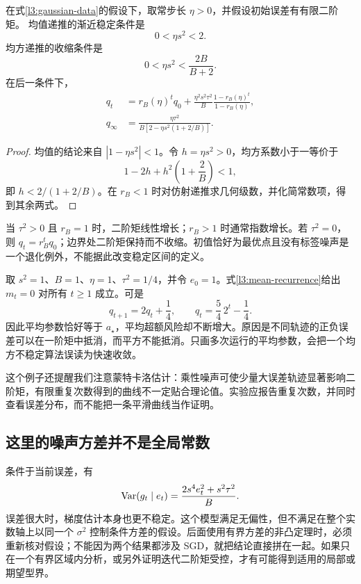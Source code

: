 \begin{theorem}[高斯随机回归的稳定条件]
在式\eqref{l3:gaussian-data}的假设下，取常步长 $\eta>0$，并假设初始误差有有限二阶矩。
均值递推的渐近稳定条件是
\begin{equation}
 0<\eta s^2<2.
 \label{l3:mean-stability}
\end{equation}
均方递推的收缩条件是
\begin{equation}
 \boxed{0<\eta s^2<\frac{2B}{B+2}}.
 \label{l3:mean-square-stability}
\end{equation}
在后一条件下，
\begin{align}
 q_t&=r_B(\eta)^t q_0+
 \frac{\eta^2s^2\tau^2}{B}\frac{1-r_B(\eta)^t}{1-r_B(\eta)},\label{l3:finite-time-q}\\
 q_\infty&=\frac{\eta\tau^2}{B\left[2-\eta s^2(1+2/B)\right]}.
 \label{l3:gaussian-floor}
\end{align}
\end{theorem}
\begin{proof}
均值的结论来自 $|1-\eta s^2|<1$。令 $h=\eta s^2>0$，均方系数小于一等价于
\[
 1-2h+h^2\left(1+\frac2B\right)<1,
\]
即 $h<2/(1+2/B)$。在 $r_B<1$ 时对仿射递推求几何级数，并化简常数项，得到其余两式。
\end{proof}

当 $\tau^2>0$ 且 $r_B=1$ 时，二阶矩线性增长；$r_B>1$ 时通常指数增长。若 $\tau^2=0$，则 $q_t=r_B^tq_0$；边界处二阶矩保持而不收缩。初值恰好为最优点且没有标签噪声是一个退化例外，不能据此改变稳定区间的定义。

\begin{example}
取 $s^2=1$、$B=1$、$\eta=1$、$\tau^2=1/4$，并令 $e_0=1$。式\eqref{l3:mean-recurrence}给出 $m_t=0$ 对所有 $t\geq1$ 成立。可是
\[
 q_{t+1}=2q_t+\frac14,
 \qquad q_t=\frac54\,2^t-\frac14.
\]
因此平均参数恰好等于 $a_\star$，平均超额风险却不断增大。原因是不同轨迹的正负误差可以在一阶矩中抵消，而平方不能抵消。只画多次运行的平均参数，会把一个均方不稳定算法误读为快速收敛。

这个例子还提醒我们注意蒙特卡洛估计：乘性噪声可使少量大误差轨迹显著影响二阶矩，有限重复次数得到的曲线不一定贴合理论值。实验应报告重复次数，并同时查看误差分布，而不能把一条平滑曲线当作证明。
\end{example}

\subsection{这里的噪声方差并不是全局常数}

条件于当前误差，有
\begin{equation}
 \operatorname{Var}(g_t\mid e_t)=\frac{2s^4e_t^2+s^2\tau^2}{B}.
 \label{l3:state-dependent-noise}
\end{equation}
误差很大时，梯度估计本身也更不稳定。这个模型满足无偏性，但不满足在整个实数轴上以同一个 $\sigma^2$ 控制条件方差的假设。后面使用有界方差的非凸定理时，必须重新核对假设；不能因为两个结果都涉及 SGD，就把结论直接拼在一起。如果只在一个有界区域内分析，或另外证明迭代二阶矩受控，才有可能得到适用的局部或期望型界。

